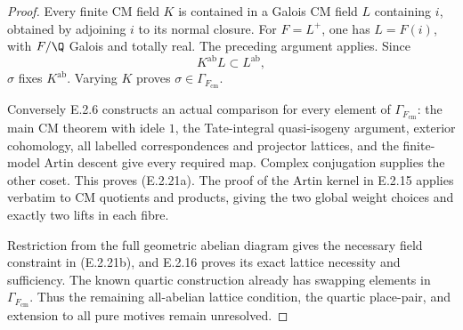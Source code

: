 \begin{proof}
Every finite CM field \(K\) is contained in
a Galois CM field \(L\) containing \(i\), obtained
by adjoining \(i\) to its normal closure.
For \(F=L^+\), one has \(L=F(i)\), with \(F/\Q\)
Galois and totally real. The preceding argument
applies. Since
\[
 K^{\mathrm{ab}}L\subset L^{\mathrm{ab}},
\]
\(\sigma\) fixes \(K^{\mathrm{ab}}\).
Varying \(K\) proves
\(\sigma\in\Gamma_{F_{\mathrm{cm}}}\).

Conversely E.2.6 constructs an actual comparison
for every element of \(\Gamma_{F_{\mathrm{cm}}}\):
the main CM theorem with idele \(1\), the
Tate-integral quasi-isogeny argument, exterior
cohomology, all labelled correspondences and
projector lattices, and the finite-model
Artin descent give every required map.
Complex conjugation supplies the other coset.
This proves (E.2.21a).
The proof of the Artin kernel in E.2.15 applies
verbatim to CM quotients and products, giving
the two global weight choices and exactly
two lifts in each fibre.

Restriction from the full geometric abelian
diagram gives the necessary field constraint
in (E.2.21b), and E.2.16 proves its exact
lattice necessity and sufficiency.
The known quartic construction already has
swapping elements in \(\Gamma_{F_{\mathrm{cm}}}\).
Thus the remaining all-abelian lattice condition,
the quartic place-pair, and extension to all
pure motives remain unresolved.
\end{proof}

